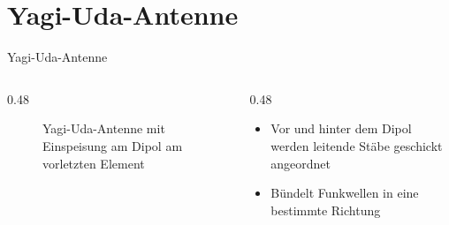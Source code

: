 \section{Yagi-Uda-Antenne}
\label{section:yagi_uda_1}
\begin{frame}{Yagi-Uda-Antenne}
    \begin{columns}
        \begin{column}{0.48\textwidth}
            \begin{figure}
                \caption{\scriptsize Yagi-Uda-Antenne mit Einspeisung am Dipol am vorletzten Element}
                \label{n_yagi_uda}
            \end{figure}
        \end{column}
        \begin{column}{0.48\textwidth}
            \begin{itemize}
                \item Vor und hinter dem Dipol werden leitende Stäbe geschickt angeordnet
                \item Bündelt Funkwellen in eine bestimmte Richtung
            \end{itemize}
        \end{column}
    \end{columns}
\end{frame}

\begin{frame}
\end{frame}%
